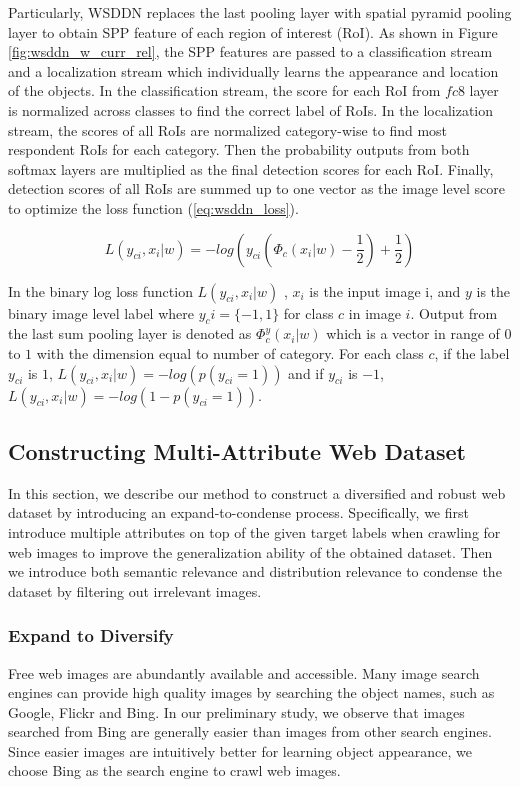 \documentclass[10pt,twocolumn,letterpaper]{article}
\begin{document}
Particularly, WSDDN replaces the last pooling layer with spatial pyramid pooling layer \cite{lazebnik2006beyond} to obtain SPP feature of each region of interest (RoI). As shown in Figure \ref{fig:wsddn_w_curr_rel}, the SPP features are passed to a classification stream and a localization stream which individually learns the appearance and location of the objects. In the classification stream, the score for each RoI from \(fc8\) layer is normalized across classes to find the correct label of RoIs. In the localization stream, the scores of all RoIs are normalized category-wise to find most respondent RoIs for each category. Then the probability outputs from both softmax layers are multiplied as the final detection scores for each RoI. Finally, detection scores of all RoIs are summed up to one vector as the image level score to optimize the loss function (\ref{eq:wsddn_loss}).

\begin{equation}\label{eq:wsddn_loss}
L(y_{ci}, x_{i} | w) = -log(y_{ci}(\Phi_{c}(x_{i}|w)-\dfrac{1}{2})+\dfrac{1}{2})
\end{equation}

In the binary log loss function \(L(y_{ci}, x_{i} | w)\) , \(x_{i}\) is the input image i, and \(y\) is the binary image level label where \(y_ci=\{-1, 1\}\) for class $c$ in image $i$. Output from the last sum pooling layer is denoted as \(\Phi_{c}^y(x_{i}|w)\) which is a vector in range of $0$ to $1$ with the dimension equal to number of category. For each class $c$, if the label \(y_{ci}\) is $1$, \(L(y_{ci}, x_{i} | w) = -log(p(y_{ci}=1))\) and if \(y_{ci}\) is $-1$, \(L(y_{ci}, x_{i} | w) = -log(1-p(y_{ci}=1))\).



\subsection {Constructing Multi-Attribute Web Dataset}
 \label{sec:expand_condense}
In this section, we describe our method to construct a diversified and robust web dataset by introducing an expand-to-condense process. Specifically, we first introduce multiple attributes on top of the given target labels when crawling for web images to improve the generalization ability of the obtained dataset. Then we introduce both semantic relevance and distribution relevance to condense the dataset by filtering out irrelevant images.

\subsubsection{Expand to Diversify}
Free web images are abundantly available and accessible. Many image search engines can provide high quality images by searching the object names, such as Google, Flickr and Bing. In our preliminary study, we observe that images searched from Bing are generally easier than images from other search engines. Since easier images are intuitively better for learning object appearance, we choose Bing as the search engine to crawl web images. 
\end{document}

